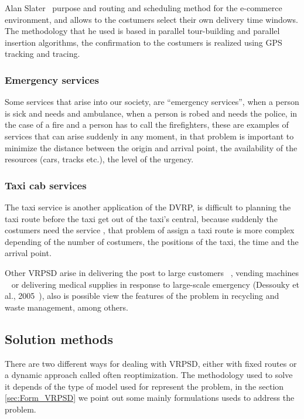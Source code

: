 Alan Slater~\cite{slater_specification_2002} purpose and routing and scheduling method for the e-commerce environment, and allows to the costumers select their own delivery time windows. The methodology that he used is based in parallel tour-building and parallel insertion algorithms, the confirmation to the costumers is realized using GPS tracking and tracing.

\subsubsection*{Emergency services}

Some services that arise into our society, are ``emergency services'', when a person is sick and needs and ambulance, when a person is robed and needs the police, in the case of a fire and a person has to call the firefighters, these are examples of services that can arise suddenly in any moment, in that problem is important to minimize the distance between the origin and arrival point, the availability of the resources (cars, tracks etc.), the level of the urgency. 

\subsubsection*{Taxi cab services}

The taxi service is another application of the DVRP, is difficult to planning the taxi route before the taxi get out of the taxi's central, because suddenly the costumers need the service , that problem of assign a taxi route is more complex depending of the number of costumers, the positions of the taxi, the time and the arrival point.

Other VRPSD arise in delivering the post to large customers ~\cite{Markovic_2005}, vending machines ~\cite{yang_stochastic_2000} or delivering medical supplies in response to large-scale emergency (Dessouky et al., 2005~\cite{dessouky_rapid_2006}), also is possible view the features of the problem in recycling and waste management, among others.

\subsection{Solution methods}

There are two different ways for dealing with VRPSD, either with fixed routes or a dynamic approach called often reoptimization. The methodology used to solve it depends of the type of model used for represent the problem, in the section \ref{sec:Form_VRPSD} we point out some mainly formulations useds to address the problem. 


